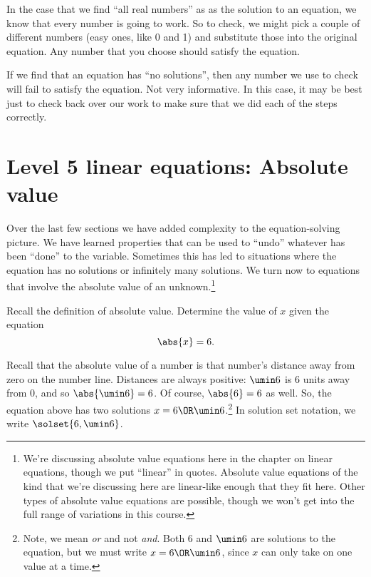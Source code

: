 In the case that we find ``all real numbers'' as as the solution to an equation, we know that every number is going to work. So to check, we might pick a couple of different numbers (easy ones, like 0 and 1) and substitute those into the original equation. Any number that you choose should satisfy the equation.

If we find that an equation has ``no solutions'', then any number we use to check will fail to satisfy the equation. Not very informative. In this case, it may be best just to check back over our work to make sure that we did each of the steps correctly.

\section{Level 5 linear equations: Absolute value}
\label{sec:linearlevel5}

Over the last few sections we have added complexity to the equation-solving picture. We have learned properties that can be used to ``undo'' whatever has been ``done'' to the variable. Sometimes this has led to situations where the equation has no solutions or infinitely many solutions. We turn now to equations that involve the absolute value of an unknown.\footnote{We're discussing absolute value equations here in the chapter on linear equations, though we put ``linear'' in quotes. Absolute value equations of the kind that we're discussing here are linear-like enough that they fit here. Other types of absolute value equations are possible, though we won't get into the full range of variations in this course.}


\begin{boxexplore}
Recall the definition of absolute value. Determine the value of $x$ given the equation \[\abs{x} = 6.\]
\end{boxexplore} %

Recall that the absolute value of a number is that number's distance away from zero on the number line. Distances are always positive: $\umin6$ is 6 units away from 0, and so $\abs{\umin6}=6$. Of course, $\abs{6} = 6$ as well. So, the equation above has two solutions $x = 6 \OR \umin6$.\footnote{Note, we mean \textit{or} and not \textit{and}. Both 6 and $\umin6$ are solutions to the equation, but we must write $x=6 \OR \umin6$, since $x$ can only take on one value at a time.} In solution set notation, we write $\solset{6, \umin6}$.

